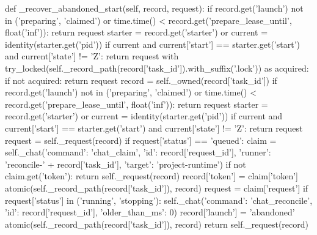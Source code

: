     def _recover_abandoned_start(self, record, request):
        if record.get('launch') not in ('preparing', 'claimed') or time.time() < record.get('prepare_lease_until', float('inf')):
            return request
        starter = record.get('starter') or {}
        current = identity(starter.get('pid'))
        if current and current['start'] == starter.get('start') and current['state'] != 'Z':
            return request
        with try_locked(self._record_path(record['task_id']).with_suffix('.lock')) as acquired:
            if not acquired:
                return request
            record = self._owned(record['task_id'])
            if record.get('launch') not in ('preparing', 'claimed') or time.time() < record.get('prepare_lease_until', float('inf')):
                return request
            starter = record.get('starter') or {}
            current = identity(starter.get('pid'))
            if current and current['start'] == starter.get('start') and current['state'] != 'Z':
                return request
            request = self._request(record)
            if request['status'] == 'queued':
                claim = self._chat({'command': 'chat_claim', 'id': record['request_id'],
                                    'runner': 'reconcile-' + record['task_id'], 'target': 'project-runtime'})
                if not claim.get('token'):
                    return self._request(record)
                record['token'] = claim['token']
                atomic(self._record_path(record['task_id']), record)
                request = claim['request']
            if request['status'] in ('running', 'stopping'):
                self._chat({'command': 'chat_reconcile', 'id': record['request_id'], 'older_than_ms': 0})
            record['launch'] = 'abandoned'
            atomic(self._record_path(record['task_id']), record)
            return self._request(record)


